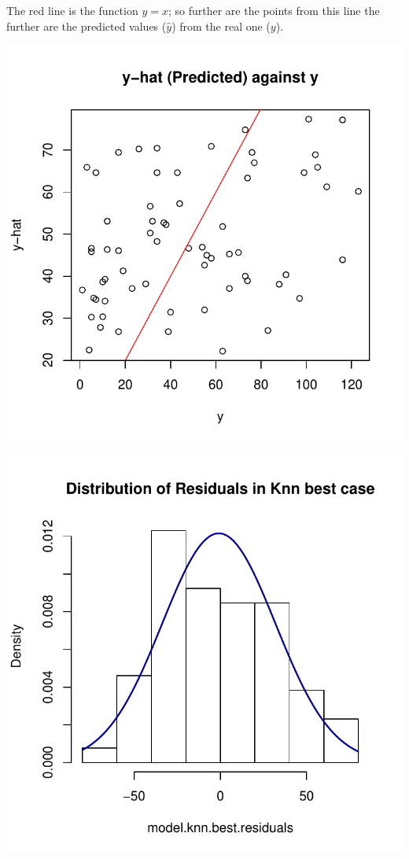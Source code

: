 \documentclass[]{report}
\begin{document}
The red line is the function $y=x$; so further are the points from this line the further are the predicted values ($\hat{y}$) from the real one ($y$).
	
\begin{center}
	\includegraphics[width=0.9\linewidth]{Figures/knn_predicted_test.pdf}
	\label{fig:knn_predicted_test}
\end{center}

\begin{center}
	\includegraphics[width=0.9\linewidth]{Figures/knn_predicted_test_residuals.pdf}
	\label{fig:knn_predicted_test_residuals}
\end{center}
\end{document}
